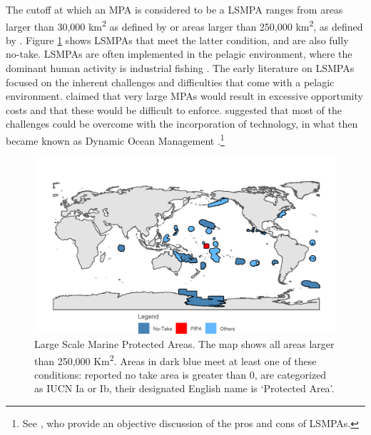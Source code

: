\documentclass[9pttwoside,lineno]{pnas-new}
\begin{document}
The cutoff at which an MPA is considered to be a LSMPA ranges from areas
larger than 30,000 km\textsuperscript{2} as defined by
\cite{desanto_2013} or areas larger than 250,000 km\textsuperscript{2},
as defined by \cite{toonen_2013}. Figure \ref{fig:LSMPAs_map} shows
LSMPAs that meet the latter condition, and are also fully no-take. LSMPAs are often
implemented in the pelagic environment, where the dominant human
activity is industrial fishing \cite{gray_2017,kroodsma_2018}. The
early literature on LSMPAs focused on the inherent challenges and
difficulties that come with a pelagic environment. \cite{kaplan_2010}
claimed that very large MPAs would result in excessive opportunity costs
and that these would be difficult to enforce. \cite{game_2009}
suggested that most of the challenges could be overcome with the
incorporation of technology, in what then became known as Dynamic Ocean
Management \citep{maxwell_2015}.\footnote{See \cite{singleton_2014}, who provide an objective discussion of the pros and cons of LSMPAs.} 

\begin{figure}
\centering
\includegraphics{img/LSMPAs_map.png}
\caption{\label{fig:LSMPAs_map}Large Scale Marine
Protected Areas. The map shows all areas larger than 250,000
Km\textsuperscript{2}. Areas in dark blue meet at least one of these
conditions: reported no take area is greater than 0, are categorized as
IUCN Ia or Ib, their designated English name is `Protected Area'.}
\end{figure}
\end{document}
